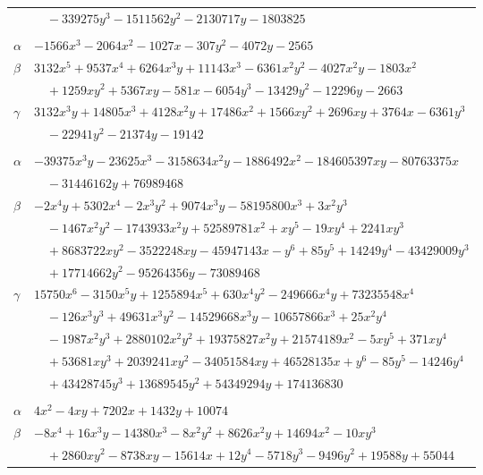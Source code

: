 \documentclass[11pt]{article}
\begin{document}
\begin{longtable}{@{}ll@{}}
 & $\quad -339275y^{3}-1511562y^{2}-2130717y-1803825$\\
\addlinespace[3pt]
\multicolumn{2}{@{}l}{$\{i,j\}=\{87,143\}$, $k_{ij}=2\cdot 7\cdot 13\cdot 19$}\\
$\alpha$ & $-1566x^{3}-2064x^{2}-1027x-307y^{2}-4072y-2565$\\
$\beta$ & $3132x^{5}+9537x^{4}+6264x^{3}y+11143x^{3}-6361x^{2}y^{2}-4027x^{2}y-1803x^{2}$\\
 & $\quad +1259xy^{2}+5367xy-581x-6054y^{3}-13429y^{2}-12296y-2663$\\
$\gamma$ & $3132x^{3}y+14805x^{3}+4128x^{2}y+17486x^{2}+1566xy^{2}+2696xy+3764x-6361y^{3}$\\
 & $\quad -22941y^{2}-21374y-19142$\\
\addlinespace[3pt]
\multicolumn{2}{@{}l}{$\{i,j\}=\{87,144\}$, $k_{ij}=2^{5}\cdot 3^{2}\cdot 5^{5}\cdot 13$}\\
$\alpha$ & $-39375x^{3}y-23625x^{3}-3158634x^{2}y-1886492x^{2}-184605397xy-80763375x$\\
 & $\quad -31446162y+76989468$\\
$\beta$ & $-2x^{4}y+5302x^{4}-2x^{3}y^{2}+9074x^{3}y-58195800x^{3}+3x^{2}y^{3}$\\
 & $\quad -1467x^{2}y^{2}-1743933x^{2}y+52589781x^{2}+xy^{5}-19xy^{4}+2241xy^{3}$\\
 & $\quad +8683722xy^{2}-3522248xy-45947143x-y^{6}+85y^{5}+14249y^{4}-43429009y^{3}$\\
 & $\quad +17714662y^{2}-95264356y-73089468$\\
$\gamma$ & $15750x^{6}-3150x^{5}y+1255894x^{5}+630x^{4}y^{2}-249666x^{4}y+73235548x^{4}$\\
 & $\quad -126x^{3}y^{3}+49631x^{3}y^{2}-14529668x^{3}y-10657866x^{3}+25x^{2}y^{4}$\\
 & $\quad -1987x^{2}y^{3}+2880102x^{2}y^{2}+19375827x^{2}y+21574189x^{2}-5xy^{5}+371xy^{4}$\\
 & $\quad +53681xy^{3}+2039241xy^{2}-34051584xy+46528135x+y^{6}-85y^{5}-14246y^{4}$\\
 & $\quad +43428745y^{3}+13689545y^{2}+54349294y+174136830$\\
\addlinespace[3pt]
\multicolumn{2}{@{}l}{$\{i,j\}=\{87,203\}$, $k_{ij}=2^{6}\cdot 3^{2}\cdot 5$}\\
$\alpha$ & $4x^{2}-4xy+7202x+1432y+10074$\\
$\beta$ & $-8x^{4}+16x^{3}y-14380x^{3}-8x^{2}y^{2}+8626x^{2}y+14694x^{2}-10xy^{3}$\\
 & $\quad +2860xy^{2}-8738xy-15614x+12y^{4}-5718y^{3}-9496y^{2}+19588y+55044$\\

\end{longtable}
\end{document}
